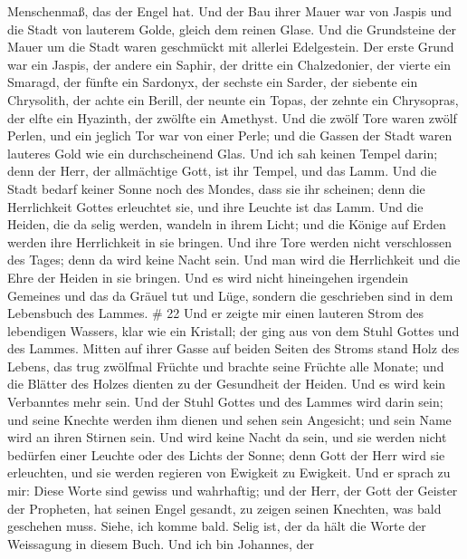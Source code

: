 Menschenmaß, das der Engel hat.  Und der Bau ihrer Mauer
war von Jaspis und die Stadt von lauterem Golde, gleich dem reinen
Glase.  Und die Grundsteine der Mauer um die Stadt waren
geschmückt mit allerlei Edelgestein. Der erste Grund war ein Jaspis, der
andere ein Saphir, der dritte ein Chalzedonier, der vierte ein Smaragd,
 der fünfte ein Sardonyx, der sechste ein Sarder, der
siebente ein Chrysolith, der achte ein Berill, der neunte ein Topas, der
zehnte ein Chrysopras, der elfte ein Hyazinth, der zwölfte ein Amethyst.
 Und die zwölf Tore waren zwölf Perlen, und ein jeglich Tor
war von einer Perle; und die Gassen der Stadt waren lauteres Gold wie
ein durchscheinend Glas.  Und ich sah keinen Tempel darin;
denn der Herr, der allmächtige Gott, ist ihr Tempel, und das Lamm.
 Und die Stadt bedarf keiner Sonne noch des Mondes, dass
sie ihr scheinen; denn die Herrlichkeit Gottes erleuchtet sie, und ihre
Leuchte ist das Lamm.  Und die Heiden, die da selig werden,
wandeln in ihrem Licht; und die Könige auf Erden werden ihre
Herrlichkeit in sie bringen.  Und ihre Tore werden nicht
verschlossen des Tages; denn da wird keine Nacht sein.  Und
man wird die Herrlichkeit und die Ehre der Heiden in sie bringen.
 Und es wird nicht hineingehen irgendein Gemeines und das
da Gräuel tut und Lüge, sondern die geschrieben sind in dem Lebensbuch
des Lammes. \# 22  Und er zeigte mir einen lauteren Strom
des lebendigen Wassers, klar wie ein Kristall; der ging aus von dem
Stuhl Gottes und des Lammes.  Mitten auf ihrer Gasse auf
beiden Seiten des Stroms stand Holz des Lebens, das trug zwölfmal
Früchte und brachte seine Früchte alle Monate; und die Blätter des
Holzes dienten zu der Gesundheit der Heiden.  Und es wird
kein Verbanntes mehr sein. Und der Stuhl Gottes und des Lammes wird
darin sein; und seine Knechte werden ihm dienen  und sehen
sein Angesicht; und sein Name wird an ihren Stirnen sein. 
Und wird keine Nacht da sein, und sie werden nicht bedürfen einer
Leuchte oder des Lichts der Sonne; denn Gott der Herr wird sie
erleuchten, und sie werden regieren von Ewigkeit zu Ewigkeit.
 Und er sprach zu mir: Diese Worte sind gewiss und
wahrhaftig; und der Herr, der Gott der Geister der Propheten, hat seinen
Engel gesandt, zu zeigen seinen Knechten, was bald geschehen muss.
 Siehe, ich komme bald. Selig ist, der da hält die Worte der
Weissagung in diesem Buch.  Und ich bin Johannes, der
